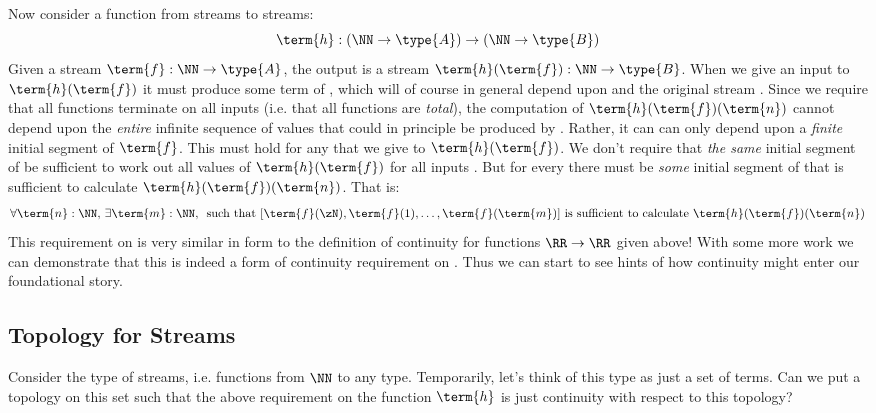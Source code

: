 Now consider a function from streams to streams: 
\[
\term{h}: (\NN \to \type{A}) \to (\NN \to \type{B})
\]
Given a stream $\term{f}:\NN \to \type{A}$, the output is a stream $\term{h}(\term{f}): \NN \to \type{B}$.  When we give an input  to $\term{h}(\term{f})$ it must produce some term of , which will of course in general depend upon  and the original stream .
Since we require that all functions terminate on all inputs (i.e. that all functions are \emph{total}), the computation of $\term{h}(\term{f})(\term{n})$ cannot depend upon the \emph{entire} infinite sequence of values that could in principle be produced by .  Rather, it can can only depend upon a \emph{finite} initial segment of $\term{f}$.  This must hold for any  that we give to $\term{h}(\term{f})$.  We don't require that \emph{the same} initial segment of  be sufficient to work out all values of $\term{h}(\term{f})$ for all inputs .  But for every  there must be \emph{some} initial segment of  that is sufficient to calculate $\term{h}(\term{f})(\term{n})$.  That is:
\[
\forall \term{n}:\NN,\,
\exists \term{m}:\NN, \,
\mbox{ such that } 
[\term{f}(\zN), \term{f}(1), \ldots, \term{f}(\term{m})]
\mbox{ is sufficient to calculate }
\term{h}(\term{f})(\term{n})
\]
This requirement on  is very similar in form to the definition of continuity for functions $\RR \to \RR$ given above!  With some more work we can demonstrate that this is indeed a form of continuity requirement on .  Thus we can start to see hints of how continuity might enter our foundational story.


\subsection{Topology for Streams}

Consider the type of streams, i.e. functions from $\NN$ to any type.  Temporarily, let's think of this type as just a set of terms.  Can we put a topology on this set such that the above requirement on the function $\term{h}$ is just continuity with respect to this topology?
